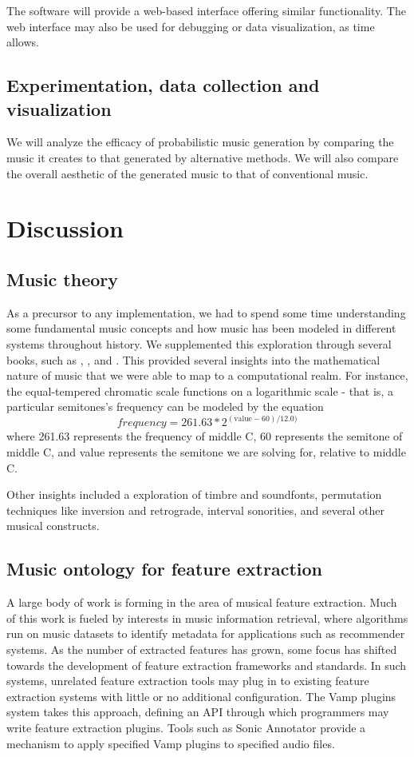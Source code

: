 \documentclass[11pt,conference,letterpaper]{IEEEtran}
\begin{document}
The software will provide a web-based interface offering similar functionality. The web interface may also be used for debugging or data visualization, as time allows.

\subsection{Experimentation, data collection and visualization}

We will analyze the efficacy of probabilistic music generation by comparing the music it creates to that generated by alternative methods.  We will also compare the overall aesthetic of the generated music to that of conventional music.

\section{Discussion}

\subsection {Music theory}

As a precursor to any implementation, we had to spend some time understanding some fundamental music concepts and how music has been modeled in different systems throughout history. We supplemented this exploration through several books, such as \cite{temperly2007mprob}, \cite{krogerGeeksNerds}, and \cite{loy2006musimathics}. This provided several insights into the mathematical nature of music that we were able to map to a computational realm. For instance, the equal-tempered chromatic scale functions on a logarithmic scale - that is, a particular semitones's frequency can be modeled by the equation
{\small
	\[frequency = 261.63 * 2^{(\text{value} - 60) / 12.0)}\]
}
where 261.63 represents the frequency of middle C, 60 represents the semitone of middle C, and value represents the semitone we are solving for, relative to middle C.

Other insights included a exploration of timbre and soundfonts, permutation techniques like inversion and retrograde, interval sonorities, and several other musical constructs.

\subsection{Music ontology for feature extraction}

A large body of work is forming in the area of musical feature extraction. Much of this work is fueled by interests in music information retrieval, where algorithms run on music datasets to identify metadata for applications such as recommender systems. As the number of extracted features has grown, some focus has shifted towards the development of feature extraction frameworks and standards. In such systems, unrelated feature extraction tools may plug in to existing feature extraction systems with little or no additional configuration. The Vamp plugins system takes this approach, defining an API through which programmers may write feature extraction plugins. Tools such as Sonic Annotator provide a mechanism to apply specified Vamp plugins to specified audio files.
\end{document}
